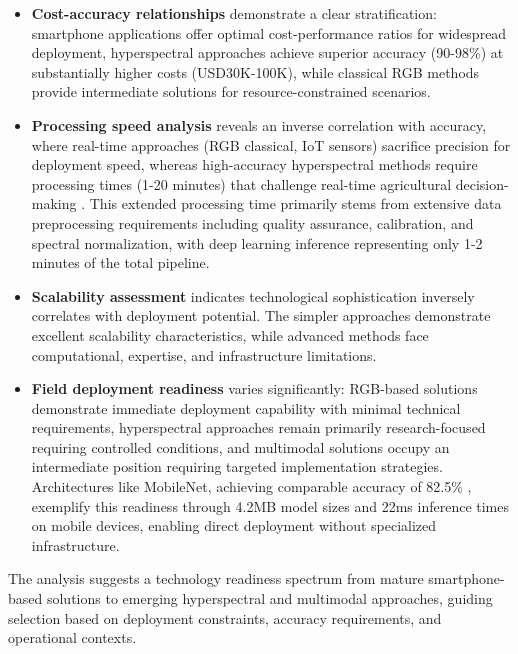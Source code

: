 \documentclass[sn-mathphys]{sn-jnl}
\theoremstyle{thmstyleone}%
\theoremstyle{thmstyletwo}%
\theoremstyle{thmstylethree}%
\begin{document}
\begin{itemize}
    \item [--]\textbf{Cost-accuracy relationships} demonstrate a clear stratification: smartphone applications offer optimal cost-performance ratios for widespread deployment, hyperspectral approaches achieve superior accuracy (90-98\%) at substantially higher costs (USD30K-100K), while classical RGB methods provide intermediate solutions for resource-constrained scenarios.
    
    \item [--] \textbf{Processing speed analysis} reveals an inverse correlation with accuracy, where real-time approaches (RGB classical, IoT sensors) sacrifice precision for deployment speed, whereas high-accuracy hyperspectral methods require processing times (1-20 minutes) that challenge real-time agricultural decision-making \citep{Viel2023time, detring2024quality}. This extended processing time primarily stems from extensive data preprocessing requirements including quality assurance, calibration, and spectral normalization, with deep learning inference representing only 1-2 minutes of the total pipeline.
    
    \item [--] \textbf{Scalability assessment} indicates technological sophistication inversely correlates with deployment potential. The simpler approaches demonstrate excellent scalability characteristics, while advanced methods face computational, expertise, and infrastructure limitations.
    
    \item [--] \textbf{Field deployment readiness} varies significantly: RGB-based solutions demonstrate immediate deployment capability with minimal technical requirements, hyperspectral approaches remain primarily research-focused requiring controlled conditions, and multimodal solutions occupy an intermediate position requiring targeted implementation strategies. Architectures like MobileNet, achieving comparable accuracy of 82.5\% \citep{moupojou2023fieldplant}, exemplify this readiness through 4.2MB model sizes and 22ms inference times on mobile devices, enabling direct deployment without specialized infrastructure.
    \end{itemize}

The analysis suggests a technology readiness spectrum from mature smartphone-based solutions to emerging hyperspectral and multimodal approaches, guiding selection based on deployment constraints, accuracy requirements, and operational contexts.
\end{document}
